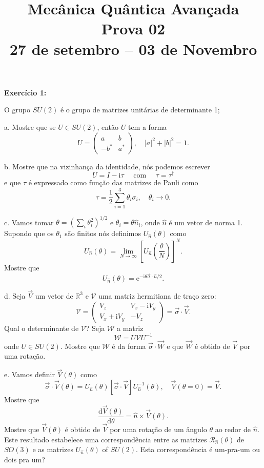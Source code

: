 \documentclass[12pt]{article}
\title{Mecânica Quântica Avançada\\%
Prova 02\\%
27 de setembro -- 03 de Novembro}
\date{}
\begin{document}
\maketitle
\vspace*{-4em}

\textbf{Exercício 1:} 

O grupo $SU(2)$ é o grupo de matrizes unitárias de determinante 1;

a. Mostre que se $U \in SU(2)$, então $U$ tem a forma
\[
U=\left(\begin{array}{cc}a & b \\ -b^{*} & a^{*}\end{array}\right), \quad|a|^{2}+|b|^{2}=1.
\]

b. Mostre que na vizinhança da identidade, nós podemos escrever
\[
U=I-\mathrm{i} \tau \quad \text{ com } \quad \tau=\tau^{\dagger}
\]
e que $\tau$ é expressado como função das matrizes de Pauli como
\[
\tau=\frac{1}{2} \sum_{i=1}^{3} \theta_{i} \sigma_{i}, \quad \theta_{i} \rightarrow 0.
\]

c. Vamos tomar $\theta=\left(\sum_{i} \theta_{i}^{2}\right)^{1 / 2}$ e $\theta_{i}=\theta \hat{n}_{i}$, onde $\hat{n}$ é um vetor de norma 1. Supondo que os $\theta_1$ são finitos nós definimos $U_{\hat{n}}(\theta)$ como
\[
U_{\hat{n}}(\theta)=\lim _{N \rightarrow \infty}\left[U_{\hat{n}}\left(\frac{\theta}{N}\right)\right]^{N}.
\]
Mostre que 
\[
U_{\hat{n}}(\theta)=\mathrm{e}^{-\mathrm{i} \theta \vec{\sigma} \cdot \hat{n} / 2}.
\]

d. Seja $\vec{V}$ um vetor de $\mathbb{R}^3$ e $\mathcal{V}$ uma matriz hermitiana de traço zero:
\[
\mathcal{V}=\left(\begin{array}{cc}V_{z} & V_{x}-\mathrm{i} V_{y} \\ V_{x}+\mathrm{i} V_{y} & -V_{z}\end{array}\right)=\vec{\sigma} \cdot \vec{V}.
\]
Qual o determinante de $\mathcal{V}$? Seja $\mathcal{W}$ a matriz
\[
\mathcal{W}=U \mathcal{V} U^{-1}
\]
onde $U \in SU(2)$.
Mostre que $\mathcal{W}$ é da forma $\vec{\sigma} \cdot \vec{W}$ e que $\vec{W}$ é obtido de $\vec{V}$ por uma rotação.

e. Vamos definir $\vec{V}(\theta)$ como
\[
\vec{\sigma} \cdot \vec{V}(\theta)=U_{\hat{n}}(\theta)[\vec{\sigma} \cdot \vec{V}] U_{\hat{n}}^{-1}(\theta), \quad \vec{V}(\theta=0)=\vec{V}.
\]
Mostre que
\[
\frac{\mathrm{d} \vec{V}(\theta)}{\mathrm{d} \theta}=\hat{n} \times \vec{V}(\theta).
\]
Mostre que $\vec{V}(\theta)$ é obtido de $\vec{V}$ por uma rotação de um ângulo $\theta$ ao redor de $\hat{n}$. Este resultado estabelece uma
correspondência entre as matrizes $\mathcal{R}_{\hat{n}}(\theta)$ de $SO(3)$ e as matrizes $U_{\hat{n}}(\theta)$ of $SU(2)$. Esta correspondência é um-pra-um ou dois pra um?
\end{document}

